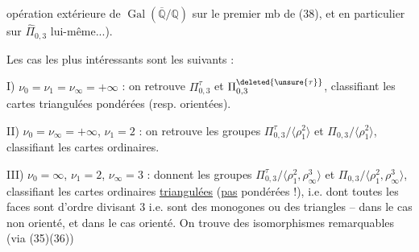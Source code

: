 opération extérieure de $\operatorname{Gal}(\overline{\mathbb Q}/\mathbb Q)$ sur le premier mb de (38), et en particulier sur $\widehat\Pi_{0,3}$ lui-même...).

Les cas les plus intéressants sont les  suivants :

I) $\nu_0=\nu_1=\nu_\infty=+\infty$ : on retrouve $\Pi_{0,3}^{\tau}$ et $\Pi_{0,3}^{\deleted{\unsure{\tau}}}$, classifiant les cartes triangulées pondérées (resp. orientées).

II) $\nu_0=\nu_\infty=+\infty$, $\nu_1=2$ : on retrouve les groupes $\Pi_{0,3}^{\tau}/\langle\rho_1^2\rangle$ et $\Pi_{0,3}/\langle\rho_1^2\rangle$, classifiant les cartes ordinaires.

III) $\nu_0=\infty$, $\nu_1=2$, $\nu_\infty=3$ : donnent les groupes $\Pi_{0,3}^{\tau}/\langle\rho_1^2,\rho_\infty^3\rangle$ et $\Pi_{0,3}/\langle\rho_1^2,\rho_\infty^3\rangle$, classifiant les cartes ordinaires \uline{triangulées} (\uline{pas} pondérées !), i.e. dont toutes les faces sont  d'ordre divisant $3$ i.e. sont des monogones ou des triangles -- dans le cas non orienté, et dans le cas orienté. On trouve des isomorphismes remarquables (via (35)(36))


